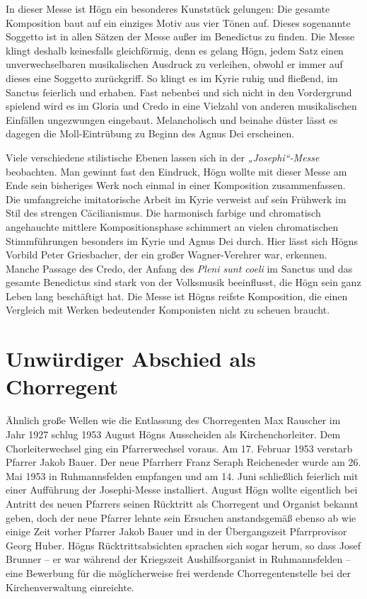 \documentclass{book}
\begin{document}
In dieser Messe ist Högn ein besonderes Kunststück gelungen: Die
gesamte Komposition baut auf ein einziges Motiv aus vier Tönen auf.
Dieses sogenannte Soggetto ist in allen Sätzen der Messe außer im
Benedictus zu finden. Die Messe klingt deshalb keinesfalls
gleichförmig, denn es gelang Högn, jedem Satz einen unverwechselbaren
musikalischen Ausdruck zu verleihen, obwohl er immer auf dieses eine
Soggetto zurückgriff. So klingt es im Kyrie ruhig und fließend, im
Sanctus feierlich und erhaben. Fast nebenbei und sich nicht in den
Vordergrund spielend wird es im Gloria und Credo in eine Vielzahl von
anderen musikalischen Einfällen ungezwungen eingebaut. Melancholisch
und beinahe düster lässt es dagegen die Moll-Eintrübung zu Beginn des
Agnus Dei erscheinen.

Viele verschiedene stilistische Ebenen lassen sich in der
\textit{„Josephi“-Messe} beobachten. Man gewinnt fast den Eindruck,
Högn wollte mit dieser Messe am Ende sein bisheriges Werk noch einmal
in einer Komposition zusammenfassen. Die umfangreiche imitatorische
Arbeit im Kyrie verweist auf sein Frühwerk im Stil des strengen
Cäcilianismus. Die harmonisch farbige und chromatisch angehauchte
mittlere Kompositionsphase schimmert an vielen chromatischen
Stimmführungen besonders im Kyrie und Agnus Dei durch. Hier lässt sich
Högns Vorbild Peter Griesbacher, der ein großer Wagner-Verehrer war,
erkennen. Manche Passage des Credo, der Anfang des \textit{Pleni sunt
coeli} im Sanctus und das gesamte Benedictus sind stark von der
Volksmusik beeinflusst, die Högn sein ganz Leben lang beschäftigt
hat. Die Messe ist Högns reifste Komposition, die einen Vergleich mit
Werken bedeutender Komponisten nicht zu scheuen braucht.

\section{Unwürdiger Abschied als Chorregent}

Ähnlich große Wellen wie die Entlassung des Chorregenten Max Rauscher im
Jahr 1927 schlug 1953 August Högns Ausscheiden als Kirchenchorleiter.
Dem Chorleiterwechsel ging ein Pfarrerwechsel voraus. Am 17. Februar
1953 verstarb Pfarrer Jakob Bauer. Der neue Pfarrherr Franz Seraph
Reicheneder wurde am 26. Mai 1953 in Ruhmannsfelden empfangen und am
14. Juni schließlich feierlich mit einer Aufführung der Josephi-Messe
installiert. August Högn wollte eigentlich bei Antritt des neuen
Pfarrers seinen Rücktritt als Chorregent und Organist bekannt geben,
doch der neue Pfarrer lehnte sein Ersuchen anstandsgemäß ebenso ab wie
einige Zeit vorher Pfarrer Jakob Bauer und in der Übergangszeit
Pfarrprovisor Georg Huber. Högns Rücktrittsabsichten sprachen sich
sogar herum, so dass Josef Brunner – er war während der Kriegszeit
Aushilfsorganist in Ruhmannsfelden – eine Bewerbung für die
möglicherweise frei werdende Chorregentenstelle bei der
Kirchenverwaltung einreichte.
\end{document}
